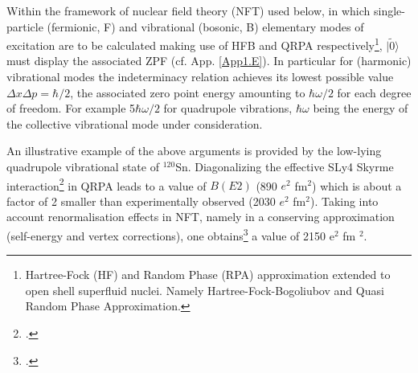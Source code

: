 Within the framework of nuclear field theory (NFT) used below, in which single-particle (fermionic, F) and vibrational
(bosonic, B) elementary modes of excitation are to be calculated making use of HFB and QRPA
respectively\footnote{Hartree-Fock (HF) and Random Phase (RPA) approximation extended to open shell superfluid nuclei. Namely Hartree-Fock-Bogoliubov and Quasi Random Phase Approximation.}, $|\tilde 0\rangle  $ must display the associated ZPF (cf. App. \ref{App1.E}). In particular for (harmonic) vibrational modes the indeterminacy relation achieves its lowest possible value 
$\Delta x \Delta p = \hbar/2$, the associated zero point energy amounting to $\hbar \omega/2$
for each degree of freedom. For example 5$\hbar \omega/2$ for quadrupole vibrations, 
$\hbar \omega$ being the energy of the collective vibrational mode under consideration. 




An illustrative example of the above arguments is provided by the low-lying quadrupole vibrational state of $^{120}$Sn. 
Diagonalizing the effective SLy4 Skyrme interaction\footnote{\cite{Ring:80}.} in QRPA leads to a value of $B(E2)$
(890 $e^2$ fm$^2$) which is about a factor of 2 smaller than experimentally observed (2030 $e^2$ fm$^2$). 
Taking into account  renormalisation effects in NFT, 
namely in a conserving  approximation (self-energy and vertex corrections),   one obtains\footnote{\cite{Barranco:04}.} a value of 2150 e$^2$ fm $^2$. 


